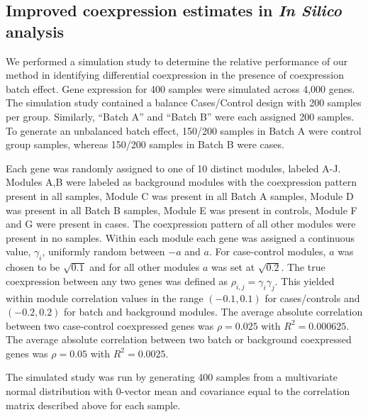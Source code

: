 \subsection{Improved coexpression estimates in \emph{In Silico} analysis}

We performed a simulation study to determine the relative performance
of our method in identifying differential coexpression in the presence
of coexpression batch effect. Gene expression for 400 samples were
simulated across 4,000 genes. The simulation study contained a balance
Cases/Control design with 200 samples per group. Similarly, ``Batch
A'' and ``Batch B'' were each assigned 200 samples. To generate
an unbalanced batch effect, 150/200 samples in Batch A were control
group samples, whereas 150/200 samples in Batch B were cases. 

Each gene was randomly assigned to one of 10 distinct modules, labeled
A-J. Modules A,B were labeled as background modules with the coexpression
pattern present in all samples, Module C was present in all Batch
A samples, Module D was present in all Batch B samples, Module E was
present in controls, Module F and G were present in cases. The coexpression
pattern of all other modules were present in no samples. Within each
module each gene was assigned a continuous value, $\gamma_{i}$, uniformly
random between $-a$ and $a$. For case-control modules, $a$ was
chosen to be $\sqrt{0.1}$ and for all other modules $a$ was set
at $\sqrt{0.2}$. The true coexpression between any two genes was
defined as $\rho_{i,j}=\gamma_{i}\gamma_{j}$. This yielded within
module correlation values in the range $\left(-0.1,0.1\right)$ for
cases/controls and $\left(-0.2,0.2\right)$ for batch and background
modules. The average absolute correlation between two case-control
coexpressed genes was $\rho=0.025$ with $R^{2}=0.000625$. The average
absolute correlation between two batch or background coexpressed genes
was $\rho=0.05$ with $R^{2}=0.0025$. 

The simulated study was run by generating 400 samples from a multivariate
normal distribution with 0-vector mean and covariance equal to the
correlation matrix described above for each sample.

